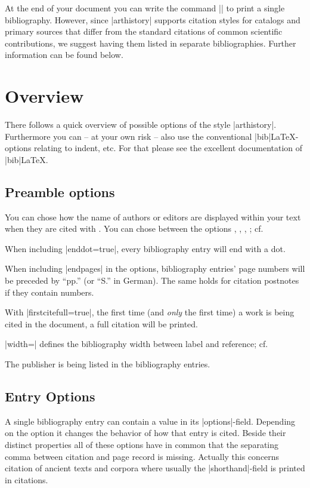 \documentclass[a4paper,
10pt,
ngerman,
english
]{ltxdoc}
\begin{document}
At the end of your document you can write the command |\printbibliography| to print 
a single bibliography.
However, since |arthistory| supports citation styles for catalogs and primary sources that differ from the standard citations of common scientific contributions, we suggest having them listed in separate bibliographies. 
Further information can be found below. %

\section{Overview}\label{overview}
There follows a quick overview of possible options of the style |arthistory|. 
Furthermore you can -- at your own risk -- also use the conventional |bib|\LaTeX-options relating to indent, etc. 
For that please see the excellent documentation of  |bib|\LaTeX.

\subsection{Preamble options}\label{preamble_options}

You can chose how the name of authors or editors are displayed within your text when they are cited with .
You can chose between the options , , , ; 
cf. %

When including |enddot=true|, every bibliography entry will end with a dot.

When including |endpages| in the options, bibliography entries' page numbers will be preceded by \enquote{pp.} (or \enquote{S.} in German). The same holds for citation postnotes if they contain numbers.

With |firstcitefull=true|, the first time (and \emph{only} the first time) a work is being cited in the document, a full citation will be printed.

|width=| defines the bibliography width between label and reference; cf. %

The publisher is being listed in the bibliography entries.


\subsection{Entry Options}
A single bibliography entry can contain a value in its |options|-field.
Depending on the option it changes the behavior of how that entry is cited.
Beside their distinct properties all of these options have in common that the separating comma between citation and page record is missing. 
Actually this concerns citation of ancient texts and corpora where usually the |shorthand|-field is printed in citations.
\end{document}
